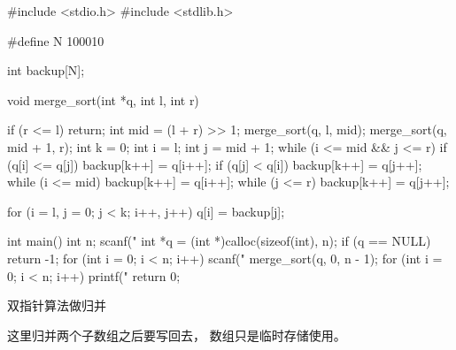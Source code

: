 \begin{mycpptwocol}
    #include <stdio.h>
    #include <stdlib.h>

    #define N 100010

    int backup[N];

    void merge_sort(int *q, int l, int r) {
        if (r <= l) {
            return;
        }
        int mid = (l + r) >> 1;
        merge_sort(q, l, mid);
        merge_sort(q, mid + 1, r);
        int k = 0;
        int i = l;
        int j = mid + 1;
        while (i <= mid && j <= r) {
            if (q[i] <= q[j]) {
                backup[k++] = q[i++];
            }
            if (q[j] < q[i]) {
                backup[k++] = q[j++];
            }
        }
        while (i <= mid) {
            backup[k++] = q[i++];
        }
        while (j <= r) {
            backup[k++] = q[j++];
        }

        for (i = l, j = 0; j < k; i++, j++) {
            q[i] = backup[j];
        }
    }

    int main() {
        int n;
        scanf("%
        int *q = (int *)calloc(sizeof(int), n);
        if (q == NULL) {
            return -1;
        }
        for (int i = 0; i < n; i++) {
            scanf("%
        }
        merge_sort(q, 0, n - 1);
        for (int i = 0; i < n; i++) {
            printf("%
        }
        return 0;
    }
\end{mycpptwocol}

双指针算法做归并

\begin{keypoint}
    这里归并两个子数组之后要写回去，  数组只是临时存储使用。
\end{keypoint}

